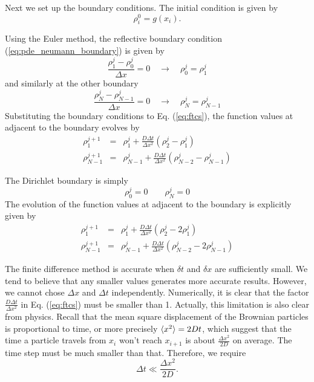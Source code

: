 Next we set up the boundary conditions. The initial condition is given by
\begin{equation}
\rho_i^0 = g(x_i).
\end{equation}


Using the Euler method,  the reflective boundary condition (\ref{eq:pde_neumann_boundary}) is given by
\begin{equation}
 \frac{\rho^j_1 - \rho^j_0}{\Delta x} = 0 \quad \rightarrow \quad \rho^j_0 = \rho^j_1
\end{equation}
and similarly at the other boundary
\begin{equation}
\frac{\rho^j_{N} - \rho^j_{N-1}}{\Delta x} = 0 \quad \rightarrow \quad \rho_N^j = \rho_{N-1}^j
\end{equation}
Substituting the boundary conditions to Eq. (\ref{eq:ftcs}),  the function values at adjacent to the boundary evolves by
\begin{subequations}
\begin{eqnarray}
\rho^{j+1}_1 &=& \rho^j_1 +  \frac{D \Delta t}{\Delta x^2} \left ( \rho^j_2  -  \rho^j_1 \right ) \\
\rho^{j+1}_{N-1} &=& \rho^j_{N-1} +  \frac{D \Delta t}{\Delta x^2} \left ( \rho^j_{N-2}-
\rho^j_{N-1} \right)
\end{eqnarray}
\end{subequations}

The Dirichlet boundary is simply
\begin{equation}
\rho^j_0=0\qquad \rho_N^j=0
\end{equation}
The evolution of the function values at adjacent to the boundary is explicitly given by
\begin{subequations}
\begin{eqnarray}
\rho^{j+1}_1 &=& \rho^j_1 +  \frac{D \Delta t}{\Delta x^2} \left ( \rho^j_2  -  2 \rho^j_1 \right ) \\
\rho^{j+1}_{N-1} &=& \rho^j_{N-1} +  \frac{D \Delta t}{\Delta x^2} \left ( \rho^j_{N-2} - 2 \rho^j_{N-1} \right )
\end{eqnarray}
\end{subequations}

The finite difference method is accurate when $\delta t$ and $\delta x$ are sufficiently small.
We tend to believe that any smaller values generates more accurate results.  However, we cannot chose $\Delta x$ and $\Delta t$ independently.  Numerically, it is clear that the factor $\displaystyle\frac{D \Delta t}{\Delta x^2}$ in Eq. (\ref{eq:ftcs}) must be smaller than 1.  Actually, this limitation is also clear from physics.  Recall that the mean square displacement of the Brownian particles is proportional to time, or more precisely $\langle x^2 \rangle = 2 D t$, which suggest that the time a particle travels from $x_i$ won't reach $x_{i+1}$ is about $\displaystyle\frac{\Delta x^2}{2D}$ on average.  The time step must be much smaller than that.
Therefore,  we require
\begin{equation}
\Delta t \ll \displaystyle\frac{\Delta x^2}{2D}.
\end{equation}


